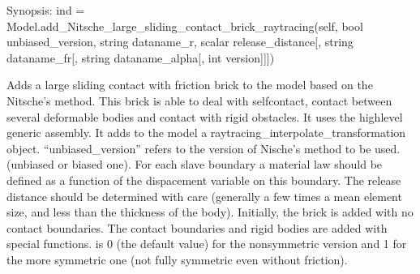 \documentclass[a4paper,11pt,english]{sphinxmanual}
\begin{document}
\begin{fulllineitems}

\begin{fulllineitems}
\label{\detokenize{python/cmdref_Model:getfem.Model.add_Nitsche_large_sliding_contact_brick_raytracing}}
Synopsis: ind = Model.add\_Nitsche\_large\_sliding\_contact\_brick\_raytracing(self, bool unbiased\_version, string dataname\_r, scalar release\_distance{[}, string dataname\_fr{[}, string dataname\_alpha{[}, int version{]}{]}{]})

Adds a large sliding contact with friction brick to the model based on the Nitsche’s method.
This brick is able to deal with self\sphinxhyphen{}contact, contact between
several deformable bodies and contact with rigid obstacles.
It uses the high\sphinxhyphen{}level generic assembly. It adds to the model
a raytracing\_interpolate\_transformation object. “unbiased\_version” refers to the version of Nische’s method to be used.
(unbiased or biased one).
For each slave boundary a  material law should be defined as a function of the dispacement variable on this boundary.
The release distance should be determined with care
(generally a few times a mean element size, and less than the
thickness of the body). Initially, the brick is added with no contact
boundaries. The contact boundaries and rigid bodies are added with
special functions.  is 0 (the default value) for the
non\sphinxhyphen{}symmetric version and 1 for the more symmetric one
(not fully symmetric even without friction).

\end{fulllineitems}



\end{fulllineitems}
\end{document}
